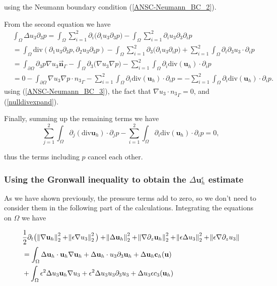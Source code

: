 \documentclass[11pt]{article}
\begin{document}
using the Neumann boundary condition (\ref{ANSC-Neumann_BC_2}).

From the second equation we have
\begin{equation}
  \begin{split}
& \int_\Omega \Delta u_3 \partial_3 p = \int_\Omega \sum_{i=1}^2 \partial_i \big( \partial_i u_3 \partial_3 p \big) - \int_\Omega \sum_{i=1}^2 \partial_i u_3 \partial_3 \partial_i p \\
 & = \int_\Omega \text{div} (\partial_1 u_3 \partial_3 p, \partial_2 u_3 \partial_3 p) - \int_\Omega \sum_{i=1}^2 \partial_3 \big( \partial_i u_3 \partial_i p \big) + \sum_{i=1}^2 \int_\Omega \partial_i \partial_3 u_3 \cdot \partial_i p\\
 & = \int_{\partial \Omega} \partial_3 p \nabla u_3 \vec{\mathbf{n}}_\Gamma - \int_\Omega \partial_3 \big( \nabla u_3 \nabla p \big) - \sum_{i=1}^2 \int_\Omega \partial_i \text{div}(\mathbf{u}_h) \cdot \partial_i p\\
 & = 0 - \int_{\partial \Omega} \nabla u_3 \nabla p \cdot {{n_3}_\Gamma} - \sum_{i=1}^2 \int_\Omega \partial_i \text{div}(\mathbf{u}_h) \cdot \partial_i p = - \sum_{i=1}^2 \int_\Omega \partial_i \text{div}(\mathbf{u}_h) \cdot \partial_i p.
  \end{split}
\end{equation}
using (\ref{ANSC-Neumann_BC_3}), the fact that $\nabla u_3 \cdot {{n_3}_\Gamma} = 0$, and (\ref{nulldivexpand}).

Finally, summing up the remaining terms we have $$ \sum_{j = 1}^2 \int_\Omega \partial_j (\text{div} \mathbf{u}_h) \cdot \partial_j p - \sum_{i=1}^2 \int_\Omega \partial_i \text{div}(\mathbf{u}_h) \cdot \partial_i p = 0,$$

thus the terms including $p$ cancel each other.

\subsubsection{Using the Gronwall inequality to obtain the $\Delta \mathbf{u}^\epsilon_h$ estimate}

As we have shown previously, the pressure terms add to zero, so we don't need to consider them in the following part of the calculations. Integrating the equations on $\Omega$ we have

\begin{equation}
  \begin{split}
& \frac{1}{2} \partial_t  \big( \norm{\nabla \mathbf{u}_h}^2_2 + \norm{\epsilon \nabla u_3}^2_2 \big ) + \norm{\Delta \mathbf{u}_h}^2_2 + \norm{\nabla \partial_z \mathbf{u}_h}^2_2 + \norm{\epsilon \Delta u_3}^2_2 + \norm{\epsilon \nabla \partial_z u_3} \\
& = \int_\Omega \Delta \mathbf{u}_h \cdot \mathbf{u}_h \nabla \mathbf{u}_h + \Delta \mathbf{u}_h \cdot u_3 \partial_3 \mathbf{u}_h +  \Delta \mathbf{u}_h \mathbf{c}_h (\mathbf{u})  \\
& + \int_\Omega \epsilon^2 \Delta u_3 \mathbf{u}_h \nabla u_3 + \epsilon^2 \Delta u_3 u_3 \partial_3 u_3 + \Delta u_3 \epsilon c_3 (\mathbf{u}_h)
  \end{split}
\end{equation}
\end{document}
